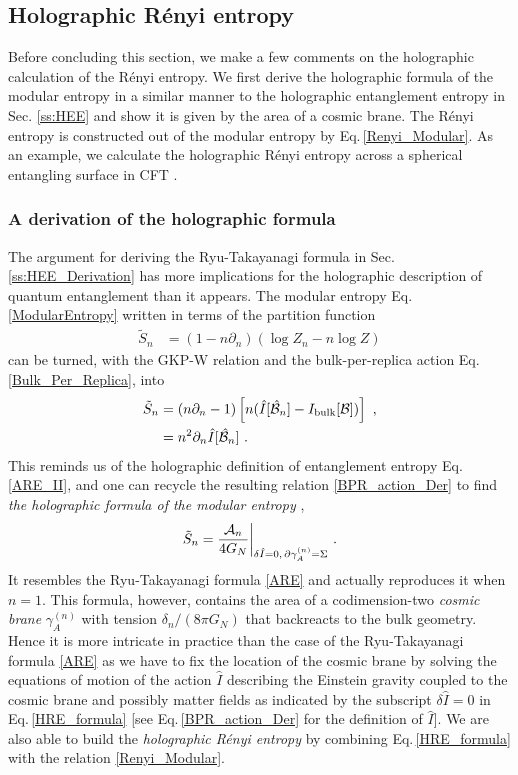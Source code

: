 \subsection{Holographic R{\'e}nyi entropy}\label{ss:HRE}
Before concluding this section, we make a few comments on the holographic calculation of the R{\'e}nyi entropy.
We first derive the holographic formula of the modular entropy in a similar manner to the holographic entanglement entropy in Sec. \ref{ss:HEE} and show it is given by the area of a cosmic brane.
The R{\'e}nyi entropy is constructed out of the modular entropy by Eq.\,\eqref{Renyi_Modular}.
As an example, we calculate the holographic R{\'e}nyi entropy across a spherical entangling surface in CFT .


\subsubsection{A derivation of the holographic formula}
The argument for deriving the Ryu-Takayanagi formula in Sec. \ref{ss:HEE_Derivation} has more implications for the holographic description of quantum entanglement than it appears.
The modular entropy Eq.\,\eqref{ModularEntropy} written in terms of the partition function
\begin{align}
	\tilde S_n &= (1 - n\partial_n) (\log Z_n - n\log Z)
\end{align}
can be turned, with the GKP-W relation and the bulk-per-replica action Eq.\,\eqref{Bulk_Per_Replica}, into
\begin{align}
	\begin{aligned}
		\tilde S_n 
		&= (n\partial_n -1 ) \left[ n (\hat I [\hat {{\cal B}}_n ] - I_\text{bulk} [ {\cal B} ] )\right] \  , \\
		&=  n^2 \partial_n \hat I [\hat {{\cal B}}_n] \ .
	\end{aligned}
\end{align}
This reminds us of the holographic definition of entanglement entropy Eq.\,\eqref{ARE_II}, and one can recycle the resulting relation \eqref{BPR_action_Der} to find \emph{the holographic formula of the modular entropy} \cite{Dong:2016fnf},
\begin{align}\label{HRE_formula}
	\tilde S_n = \frac{{\cal A}_n}{4G_N}\bigg|_{\delta \hat I = 0, \,\partial \gamma^{(n)}_A = \Sigma} \ .
\end{align}
It resembles the Ryu-Takayanagi formula \eqref{ARE} and actually reproduces it when $n=1$.
This formula, however, contains the area of a codimension-two \emph{cosmic brane} $\gamma_A^{(n)}$ with tension $\delta_n/(8\pi G_N)$ that backreacts to the bulk geometry.
Hence it is more intricate in practice than the case of the Ryu-Takayanagi formula \eqref{ARE} as we have to fix the location of the cosmic brane by solving the equations of motion of the action $\hat I$ describing the Einstein gravity coupled to the cosmic brane and possibly matter fields as indicated by the subscript $\delta \hat I = 0$ in Eq.\,\eqref{HRE_formula} [see Eq.\,\eqref{BPR_action_Der} for the definition of $\hat I$].
We are also able to build the \emph{holographic R{\'e}nyi entropy} by combining Eq.\,\eqref{HRE_formula} with the relation \eqref{Renyi_Modular}.

